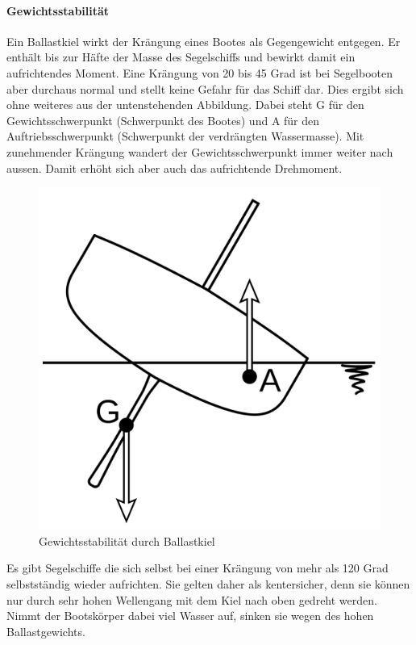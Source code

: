 \paragraph{Gewichtsstabilität}
Ein Ballastkiel wirkt der Krängung eines Bootes als Gegengewicht entgegen. Er enthält bis zur Häfte der Masse des Segelschiffs und bewirkt damit ein aufrichtendes Moment. Eine Krängung von 20 bis 45 Grad ist bei Segelbooten aber durchaus normal und stellt keine Gefahr für das Schiff dar. Dies ergibt sich ohne weiteres aus der untenstehenden Abbildung. Dabei steht G für den Gewichtsschwerpunkt (Schwerpunkt des Bootes) und A für den Auftriebsschwerpunkt (Schwerpunkt der verdrängten Wassermasse). Mit zunehmender Krängung wandert der Gewichtsschwerpunkt immer weiter nach aussen. Damit erhöht sich aber auch das aufrichtende Drehmoment. 
\begin{figure}[H]
    \centering
    \includegraphics[width=0.25\linewidth]{Segeln_Gewichtsstabilitaet.svg.png}
    \caption{Gewichtsstabilität durch Ballastkiel }
    \label{fig:enter-label}
\end{figure}
Es gibt Segelschiffe die sich selbst bei einer Krängung von mehr als 120 Grad selbstständig wieder aufrichten. Sie gelten daher als kentersicher, denn sie können nur durch sehr hohen Wellengang mit dem Kiel nach oben gedreht werden. Nimmt der Bootskörper dabei viel Wasser auf, sinken sie wegen des hohen Ballastgewichts. 
